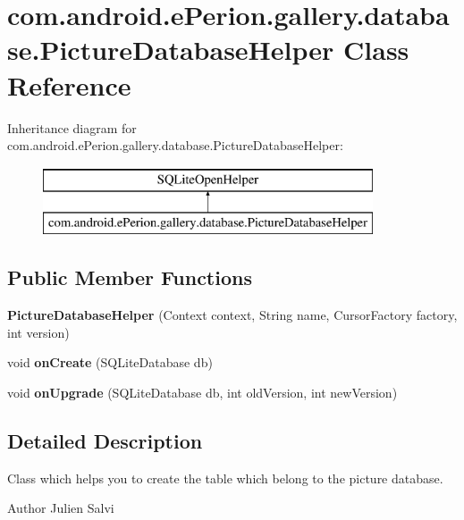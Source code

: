 \section{com.\-android.\-e\-Perion.\-gallery.\-database.\-Picture\-Database\-Helper Class Reference}
\label{classcom_1_1android_1_1e_perion_1_1gallery_1_1database_1_1_picture_database_helper}
Inheritance diagram for com.\-android.\-e\-Perion.\-gallery.\-database.\-Picture\-Database\-Helper\-:\begin{figure}[H]
\begin{center}
\leavevmode
\includegraphics[height=2.000000cm]{classcom_1_1android_1_1e_perion_1_1gallery_1_1database_1_1_picture_database_helper}
\end{center}
\end{figure}
\subsection*{Public Member Functions}
\begin{DoxyCompactItemize}
\item 
{\bf Picture\-Database\-Helper} (Context context, String name, Cursor\-Factory factory, int version)
\item 
void {\bfseries on\-Create} (S\-Q\-Lite\-Database db)\label{classcom_1_1android_1_1e_perion_1_1gallery_1_1database_1_1_picture_database_helper_a871e9aa5d08fc313b549a85b279779b3}

\item 
void {\bfseries on\-Upgrade} (S\-Q\-Lite\-Database db, int old\-Version, int new\-Version)\label{classcom_1_1android_1_1e_perion_1_1gallery_1_1database_1_1_picture_database_helper_ac85a9499cdda8bd04fde452fc4a42d3b}

\end{DoxyCompactItemize}


\subsection{Detailed Description}
Class which helps you to create the table which belong to the picture database. \begin{DoxyAuthor}{Author}
Julien Salvi 
\end{DoxyAuthor}



